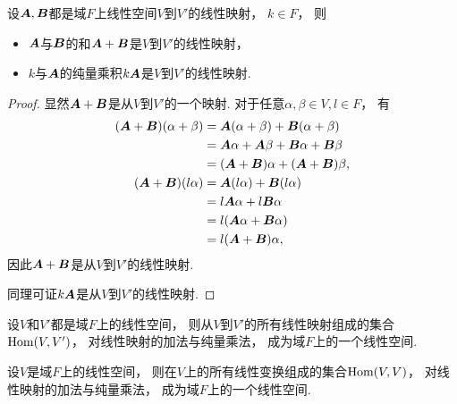 \begin{proposition}
设\(\boldsymbol{A},\boldsymbol{B}\)都是域\(F\)上线性空间\(V\)到\(V'\)的线性映射，
\(k\in F\)，
则\begin{itemize}
	\item \(\boldsymbol{A}\)与\(\boldsymbol{B}\)的和\(\boldsymbol{A}+\boldsymbol{B}\)是\(V\)到\(V'\)的线性映射，
	\item \(k\)与\(\boldsymbol{A}\)的纯量乘积\(k\boldsymbol{A}\)是\(V\)到\(V'\)的线性映射.
\end{itemize}
\begin{proof}
显然\(\boldsymbol{A}+\boldsymbol{B}\)是从\(V\)到\(V'\)的一个映射.
对于任意\(\alpha,\beta \in V,
l \in F\)，
有\begin{align*}
	(\boldsymbol{A}+\boldsymbol{B})(\alpha+\beta)
	&= \boldsymbol{A}(\alpha+\beta) + \boldsymbol{B}(\alpha+\beta) \\
	&= \boldsymbol{A}\alpha + \boldsymbol{A}\beta + \boldsymbol{B}\alpha + \boldsymbol{B}\beta \\
	&= (\boldsymbol{A}+\boldsymbol{B})\alpha + (\boldsymbol{A}+\boldsymbol{B})\beta, \\
	(\boldsymbol{A}+\boldsymbol{B})(l\alpha)
	&= \boldsymbol{A}(l\alpha) + \boldsymbol{B}(l\alpha) \\
	&= l\boldsymbol{A}\alpha + l\boldsymbol{B}\alpha \\
	&= l(\boldsymbol{A}\alpha + \boldsymbol{B}\alpha) \\
	&= l(\boldsymbol{A}+\boldsymbol{B}) \alpha,
\end{align*}
因此\(\boldsymbol{A}+\boldsymbol{B}\)是从\(V\)到\(V'\)的线性映射.

同理可证\(k\boldsymbol{A}\)是从\(V\)到\(V'\)的线性映射.
\end{proof}
\end{proposition}

\begin{proposition}
设\(V\)和\(V'\)都是域\(F\)上的线性空间，
则从\(V\)到\(V'\)的所有线性映射组成的集合\(\operatorname{Hom}(V,V')\)，
对线性映射的加法与纯量乘法，
成为域\(F\)上的一个线性空间.
\end{proposition}
\begin{corollary}
设\(V\)是域\(F\)上的线性空间，
则在\(V\)上的所有线性变换组成的集合\(\operatorname{Hom}(V,V)\)，
对线性映射的加法与纯量乘法，
成为域\(F\)上的一个线性空间.
\end{corollary}

